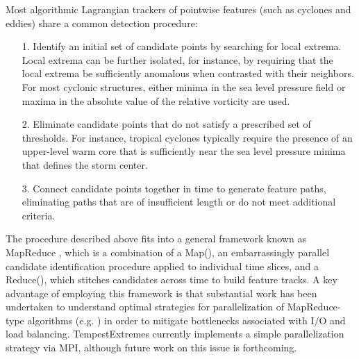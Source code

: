 \documentclass[gmdd, hvmath, online]{copernicus_discussions}
\begin{document}
Most algorithmic Lagrangian trackers of pointwise features (such as cyclones and eddies) share a common detection procedure:
\begin{itemize}
\item[1.] Identify an initial set of candidate points by searching for local extrema.  Local extrema can be further isolated, for instance, by requiring that the local extrema be sufficiently anomalous when contrasted with their neighbors.  For most cyclonic structures, either minima in the sea level pressure field or maxima in the absolute value of the relative vorticity are used.
\item[2.] Eliminate candidate points that do not satisfy a prescribed set of thresholds.  For instance, tropical cyclones typically require the presence of an upper-level warm core that is sufficiently near the sea level pressure minima that defines the storm center.
\item[3.] Connect candidate points together in time to generate feature paths, eliminating paths that are of insufficient length or do not meet additional criteria.
\end{itemize}  The procedure described above fits into a general framework known as MapReduce \citep{dean2008mapreduce}, which is a combination of a Map(), an embarrassingly parallel candidate identification procedure applied to individual time slices, and a Reduce(), which stitches candidates across time to build feature tracks.  A key advantage of employing this framework is that substantial work has been undertaken to understand optimal strategies for parallelization of MapReduce-type algorithms (e.g. \cite{Prabhat2012}) in order to mitigate bottlenecks associated with I/O and load balancing.  TempestExtremes currently implements a simple parallelization strategy via MPI, although future work on this issue is forthcoming.
\end{document}
